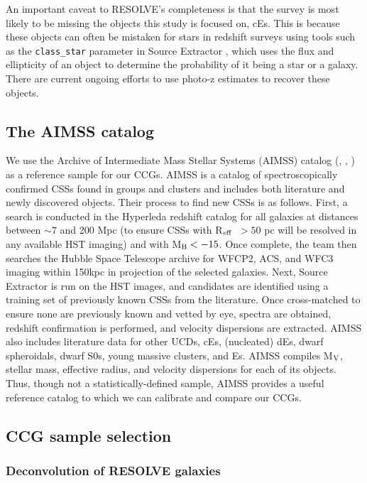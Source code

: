 \documentclass[iop,apj]{emulateapj}
\newcommand{\Reff}{R$_{\rm eff}$}
\begin{document}
An important caveat to RESOLVE's completeness is that the survey is most likely to be missing the objects this study is focused on, cEs. This is because these objects can often be mistaken for stars in redshift surveys using tools such as the \texttt{class\_star} parameter in Source Extractor \citep{Bertin1996}, which uses the flux and ellipticity of an object to determine the probability of it being a star or a galaxy. There are current ongoing efforts to use photo-z estimates to recover these objects.

\subsection{The AIMSS catalog}
\label{aimss}

\noindent We use the Archive of Intermediate Mass Stellar Systems (AIMSS) catalog (\citet{Norris2014}, \citet{Forbes2014}, \citet{Janz2015}) as a reference sample for our CCGs.  AIMSS is a catalog of spectroscopically confirmed CSSs found in groups and clusters and includes both literature and newly discovered objects. Their process to find new CSSs is as follows. First, a search is conducted in the Hyperleda redshift catalog \citep{Paturel2003} for all galaxies at distances between $\sim 7$ and 200 Mpc (to ensure CSSs with \Reff\ $> 50$ pc will be resolved in any available HST imaging) and with M$_{\rm B} < -15$. Once complete, the team then searches the Hubble Space Telescope archive for WFCP2, ACS, and WFC3 imaging within 150kpc in projection of the selected galaxies. Next, Source Extractor is run on the HST images, and candidates are identified using a training set of previously known CSSs from the literature. Once cross-matched to ensure none are previously known and vetted by eye, spectra are obtained, redshift confirmation is performed, and velocity dispersions are extracted. AIMSS also includes literature data for other UCDs, cEs, (nucleated) dEs, dwarf spheroidals, dwarf S0s, young massive clusters, and Es. AIMSS compiles M$_{\rm V}$, stellar mass, effective radius, and velocity dispersions for each of its objects. Thus, though not a statistically-defined sample, AIMSS provides a useful reference catalog to which we can calibrate and compare our CCGs.

\subsection{CCG sample selection}

\subsubsection{Deconvolution of RESOLVE galaxies}
\label{deconv}
\end{document}
